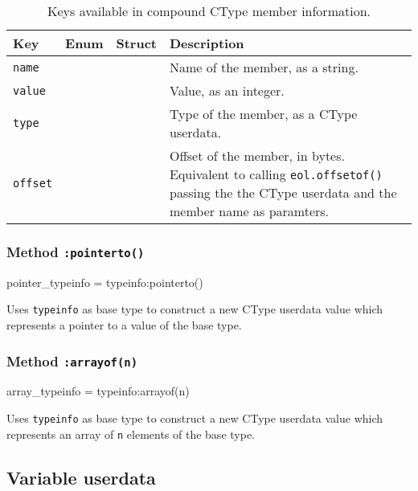 \begin{table}[ht]
	\centering
	\begin{tabular}{lccp{}}
		\toprule
		Key & Enum & Struct & Description\\
		\midrule
		\texttt{name}  & \Tick & \Tick & Name of the member, as a string. \\
		\texttt{value} & \Tick &       & Value, as an integer. \\
		\texttt{type}  &       & \Tick & Type of the member, as a \textsf{CType} userdata. \\
		\texttt{offset}&       & \Tick & Offset of the member, in bytes.
			Equivalent to calling \texttt{eol.offsetof()} passing the the
			\textsf{CType} userdata and the member name as paramters. \\
		\bottomrule
	\end{tabular}
	\caption{Keys available in compound \textsf{CType} member information.}
	\label{tab:eol-api-ctype-compound-member-fields}
\end{table}


\subsubsection{Method \texttt{:pointerto()}}

\begin{luacode}
pointer_typeinfo = typeinfo:pointerto()
\end{luacode}

Uses \texttt{typeinfo} as base type to construct a new \textsf{CType} userdata
value which represents a pointer to a value of the base type.


\subsubsection{Method \texttt{:arrayof(n)}}

\begin{luacode}
array_typeinfo = typeinfo:arrayof(n)
\end{luacode}

Uses \texttt{typeinfo} as base type to construct a new \textsf{CType} userdata
value which represents an array of \texttt{n} elements of the base type.


\subsection{Variable userdata}
	\label{sec:eol-api-variable-t}

